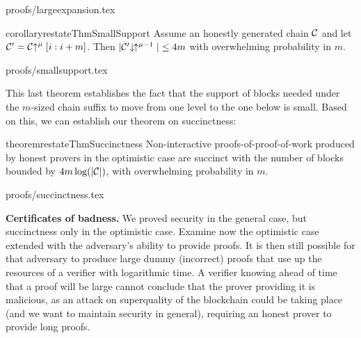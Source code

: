 \ifonecolumn
{proofs/largeexpansion.tex}
\fi

\begin{restatable}{corollary}{restateThmSmallSupport}
    \label{crly.small-support}
    Assume an honestly generated chain $\mathcal{C}$ and let $\mathcal{C}' = \mathcal{C}\negthickspace\uparrow^\mu[i:i + m]$. Then
    $|\mathcal{C}'\negthickspace\downarrow\,\negthickspace\uparrow^{\mu - 1}| \leq 4m$
    with overwhelming probability in $m$.
\end{restatable}

\ifonecolumn
{proofs/smallsupport.tex}
\fi

This last theorem establishes the fact that the support of blocks needed under
the $m$-sized chain suffix to move from one level to the one below is small.
Based on this, we can establish our theorem on succinctness:

\begin{restatable}{theorem}{restateThmSuccinctness}
    \label{thm.succinctness}
    Non-interactive proofs-of-proof-of-work produced by honest provers in the
    optimistic case are succinct with the number of blocks bounded by $4m
    \log(|\mathcal{C}|)$, with overwhelming probability in $m$.
\end{restatable}

\ifonecolumn
{proofs/succinctness.tex}
\else
\fi

\textbf{Certificates of badness.}
We proved security in the general case, but succinctness only in the optimistic
case. Examine now the optimistic case extended with the adversary's ability to
provide proofs. It is then still possible for that adversary to produce large
dummy (incorrect) proofs that use up the resources of a verifier with
logarithmic time. A verifier knowing ahead of time that a proof will be large
cannot conclude that the prover providing it is malicious, as an attack on
superquality of the blockchain could be taking place (and we want to maintain
security in general), requiring an honest prover to provide long proofs.

